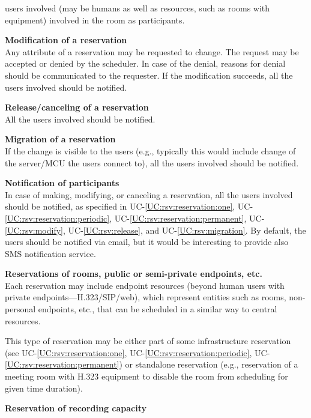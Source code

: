 \documentclass[a4paper]{report}
\makeatletter
\newcounter{UCcounter}
\newenvironment{UseCases}%
	{\begin{list}{\textbf{UC-\arabic{UCcounter}}}{\@nmbrlisttrue\def\@listctr{UCcounter}}}%
	{\end{list}}
\newcommand{\UClabel}[1]{\label{UC:#1}}
\newcommand{\UCref}[1]{UC-\ref{UC:#1}}
\newcommand{\UseCase}[2]{\item\UClabel{#2} \textbf{#1}\\}
\makeatother
\begin{document}
\begin{UseCases}
\begin{compactitem}
\item users involved (may be humans as well as resources, such as rooms with
equipment) involved in the room as participants.

\end{compactitem}

\UseCase{Modification of a reservation}{rsv:modify}

Any attribute of a reservation may be requested to change. The request may be
accepted or denied by the scheduler. In case of the denial, reasons for denial
should be communicated to the requester. If the modification succeeds, all the
users involved should be notified.

\UseCase{Release/canceling of a reservation}{rsv:release}

All the users involved should be notified.

\UseCase{Migration of a reservation}{rsv:migration}

If the change is visible to the users (e.g., typically this would include
change of the server/MCU the users connect to), all the users involved should
be notified.

\UseCase{Notification of participants}{rsv:notification}

In case of making, modifying, or canceling a reservation, all the users
involved should be notified, as specified in \UCref{rsv:reservation:one},
\UCref{rsv:reservation:periodic}, \UCref{rsv:reservation:permanent},
\UCref{rsv:modify}, \UCref{rsv:release}, and \UCref{rsv:migration}. By default,
the users should be notified via email, but it would be interesting to provide
also SMS notification service.

\UseCase{Reservations of rooms, public or semi-private endpoints,
etc.}{rsv:service-users}

Each reservation may include endpoint resources (beyond human users with
private endpoints---H.323/SIP/web), which represent entities such as rooms,
non-personal endpoints, etc., that can be scheduled in a similar way to central
resources.

This type of reservation may be either part of some infrastructure reservation
(see \UCref{rsv:reservation:one}, \UCref{rsv:reservation:periodic},
\UCref{rsv:reservation:permanent}) or standalone reservation (e.g., reservation
of a meeting room with H.323 equipment to disable the room from scheduling for
given time duration).


\UseCase{Reservation of recording capacity}{rsv:recording}


\end{UseCases}
\end{document}
